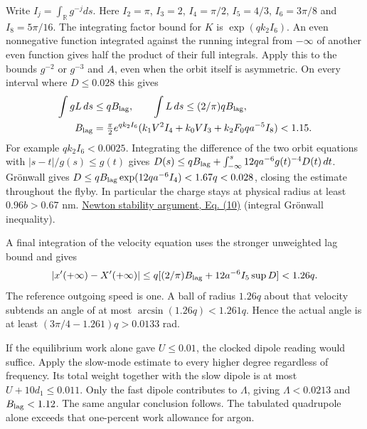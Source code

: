 \documentclass[11pt,a4paper]{article}
\begin{document}
Write \(I_j=\int_{\mathbb R}g^{-j}ds\). Here \(I_2=\pi\), \(I_3=2\),
\(I_4=\pi/2\), \(I_5=4/3\), \(I_6=3\pi/8\) and \(I_8=5\pi/16\). The
integrating factor bound for \(K\) is \(\exp(q k_2 I_6)\). An even
nonnegative function integrated against the running integral from
\(-\infty\) of another even function gives half the product of their
full integrals. Apply this to the bounds \(g^{-2}\) or \(g^{-3}\) and
\(A\), even when the orbit itself is asymmetric. On every interval where
\(D\le0.028\) this gives \[
 \begin{aligned}
 \int gL\,ds&\le q B_{\rm lag},\qquad
 \int L\,ds\le (2/\pi)q B_{\rm lag},\\
 B_{\rm lag}&=\tfrac{\pi}{2}e^{q k_2 I_6}
       (k_1V^2 I_4+k_0 V I_3+k_2 F_0 q a^{-5} I_8)<1.15 .
 \end{aligned}
\] For example \(qk_2 I_6<0.0025\). Integrating the difference of the
two orbit equations with \(|s-t|/g(s)\le g(t)\) gives
\(D(s)\le q B_{\rm lag}+\int_{-\infty}^s12q a^{-6}g(t)^{-4}D(t)\,dt\).
Grönwall gives \(D\le q B_{\rm lag}\exp(12q a^{-6}I_4)<1.67q<0.028\),
closing the estimate throughout the flyby. In particular the charge
stays at physical radius at least \(0.96b>0.67\) nm.
\href{balaban-ode-lesson.md}{Newton stability argument, Eq. (10)}
(integral Grönwall inequality).

A final integration of the velocity equation uses the stronger
unweighted lag bound and gives \[
 |x'(+\infty)-X'(+\infty)|
 \le q[(2/\pi)B_{\rm lag}+12 a^{-6} I_5\sup D]<1.26q .
\] The reference outgoing speed is one. A ball of radius \(1.26q\) about
that velocity subtends an angle of at most \(\arcsin(1.26q)<1.261q\).
Hence the actual angle is at least \((3\pi/4-1.261)q>0.0133\) rad.

If the equilibrium work alone gave \(U\le0.01\), the clocked dipole
reading would suffice. Apply the slow-mode estimate to every higher
degree regardless of frequency. Its total weight together with the slow
dipole is at most \(U+10d_1\le0.011\). Only the fast dipole contributes
to \(\Lambda\), giving \(\Lambda<0.0213\) and \(B_{\rm lag}<1.12\). The
same angular conclusion follows. The tabulated quadrupole alone exceeds
that one-percent work allowance for argon.
\end{document}
